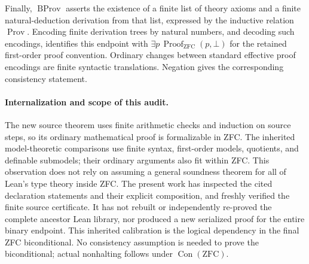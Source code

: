 Finally, $\operatorname{BProv}$ asserts the existence of a finite
list of theory axioms and a finite natural-deduction derivation
from that list, expressed by the inductive relation
$\operatorname{Prov}$.  Encoding finite derivation trees by natural numbers,
and decoding such encodings, identifies this endpoint with
$\exists p\,\operatorname{Proof}_{\mathrm{ZFC}}(p,\bot)$
for the retained first-order proof convention.  Ordinary changes
between standard effective proof encodings are finite syntactic
translations.  Negation gives the corresponding consistency
statement.

\paragraph{Internalization and scope of this audit.}
The new source theorem uses finite arithmetic checks and induction
on source steps, so its ordinary mathematical proof is formalizable
in ZFC.  The inherited model-theoretic comparisons use finite
syntax, first-order models, quotients, and definable submodels;
their ordinary arguments also fit within ZFC.  This observation
does not rely on assuming a general soundness theorem for all of
Lean's type theory inside ZFC.  The present work has inspected
the cited declaration statements and their explicit composition,
and freshly verified the finite source certificate.  It has not
rebuilt or independently re-proved the complete ancestor Lean
library, nor produced a new serialized proof for the entire
binary endpoint. This inherited calibration is the logical
dependency in the final ZFC biconditional. No consistency assumption is needed to prove the
biconditional; actual nonhalting follows under
$\operatorname{Con}(\mathrm{ZFC})$.
